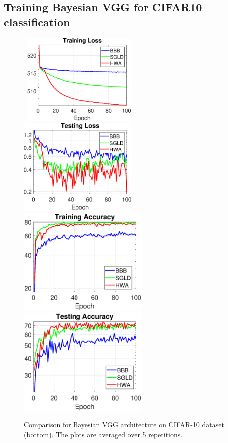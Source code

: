 \documentclass{article} %
\begin{document}
\subsection{Training Bayesian VGG for CIFAR10 classification}
\begin{figure}[H]
\mbox{
\includegraphics[width=0.49\textwidth]{figs/trainlosscifar.eps}
\includegraphics[width=0.51\textwidth]{figs/testlosscifar.eps}
}
\mbox{
\hspace{-0.2in}\includegraphics[width=0.56\textwidth]{figs/trainacccifar.eps}\hspace{-0.3in}
\includegraphics[width=0.56\textwidth]{figs/testacccifar.eps}
}
\caption{Comparison for Bayesian VGG architecture on CIFAR-10 dataset (bottom). The plots are averaged over 5 repetitions.}
    \label{fig:cifar}
\end{figure}
\end{document}
